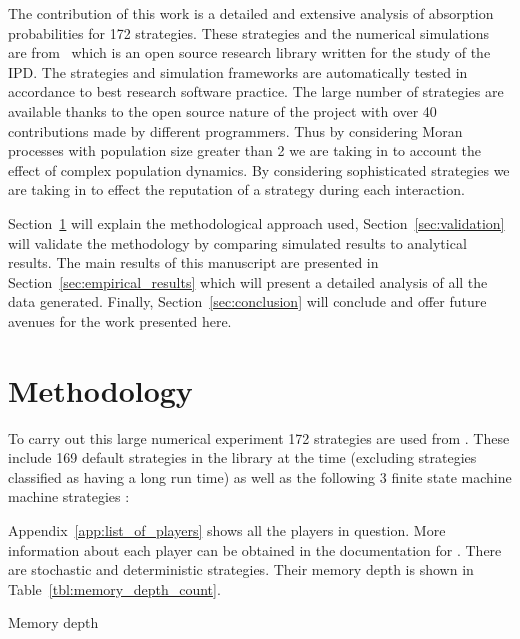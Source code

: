 \documentclass{article}
\begin{document}
The contribution of this work is a detailed and extensive analysis of absorption
probabilities for 172 strategies. These strategies and the numerical simulations
are from~\cite{axelrodproject} which is an open source research library written
for the study of the IPD\@. The strategies and simulation frameworks are
automatically tested in accordance to best research software practice. The large
number of strategies are available thanks to the open source nature of the
project with over 40 contributions made by different programmers. Thus by
considering Moran processes with population size greater than 2 we are taking in
to account the effect of complex population dynamics. By considering
sophisticated strategies we are taking in to effect the reputation of a strategy
during each interaction.

Section~\ref{sec:methodology} will explain the methodological approach used,
Section~\ref{sec:validation} will validate the methodology by comparing
simulated results to analytical results. The main results of this manuscript are
presented in Section~\ref{sec:empirical_results} which will present a detailed
analysis of all the data generated. Finally, Section~\ref{sec:conclusion} will
conclude and offer future avenues for the work presented here.

\section{Methodology}\label{sec:methodology}

To carry out this large numerical experiment 172 strategies are used from
\cite{axelrodproject}. These include 169 default strategies in the library at
the time (excluding strategies classified as having a long run time) as well as
the following 3 finite state machine machine strategies \cite{Ashlock2006}:


Appendix~\ref{app:list_of_players} shows all the players in question. More
information about each player can be obtained in the documentation for
\cite{axelrodproject}. There are stochastic and
deterministic strategies. Their memory
depth is shown in Table~\ref{tbl:memory_depth_count}.

\begin{table}[!hbtp]
    \centering
        
        \caption{Memory depth}
        \label{tbl:memory_depth_count}
\end{table}
\end{document}
